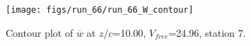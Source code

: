 \begin{figure}[H]
\centering
\texttt{[image: figs/run\_66/run\_66\_W\_contour]}
\caption{Contour plot of $\overline{w}$ at $z/c$=10.00, $V_{free}$=24.96, station 7.}
\end{figure}


